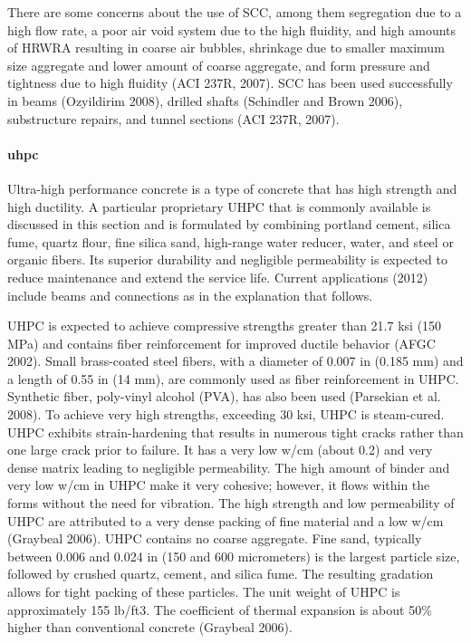 There are some concerns about the use of SCC, among them segregation due to a high flow rate, a poor air void system due to the high fluidity, and high amounts of HRWRA resulting in coarse air bubbles, shrinkage due to smaller maximum size aggregate and lower amount of coarse aggregate, and form pressure and tightness due to high fluidity (ACI 237R, 2007). SCC has been used successfully in beams (Ozyildirim 2008), drilled shafts (Schindler and Brown 2006), substructure repairs, and tunnel sections (ACI 237R, 2007).

\paragraph{\acrfull*{uhpc}}

Ultra-high performance concrete is a type of concrete that has high strength and high ductility. A particular proprietary UHPC that is commonly available is discussed in this section and is formulated by combining portland cement, silica fume, quartz flour, fine silica sand, high-range water reducer, water, and steel or organic fibers. Its superior durability and negligible permeability is expected to reduce maintenance and extend the service life. Current applications (2012) include beams and connections as in the explanation that follows.

UHPC is expected to achieve compressive strengths greater than 21.7 ksi (150 MPa) and contains fiber reinforcement for improved ductile behavior (AFGC 2002). Small brass-coated steel fibers, with a diameter of 0.007 in (0.185 mm) and a length of 0.55 in (14 mm), are commonly used as fiber reinforcement in UHPC. Synthetic fiber, poly-vinyl alcohol (PVA), has also been used (Parsekian et al. 2008). To achieve very high strengths, exceeding 30 ksi, UHPC is steam-cured. UHPC exhibits strain-hardening that results in numerous tight cracks rather than one large crack prior to failure. It has a very low w/cm (about 0.2) and very dense matrix leading to negligible permeability. The high amount of binder and very low w/cm in UHPC make it very cohesive; however, it flows within the forms without the need for vibration. The high strength and low permeability of UHPC are attributed to a very dense packing of fine material and a low w/cm (Graybeal 2006). UHPC contains no coarse aggregate. Fine sand, typically between 0.006 and 0.024 in (150 and 600 micrometers) is the largest particle size, followed by crushed quartz, cement, and silica fume. The resulting gradation allows for tight packing of these particles. The unit weight of UHPC is approximately 155 lb/ft3. The coefficient of thermal expansion is about 50\% higher than conventional concrete (Graybeal 2006).

